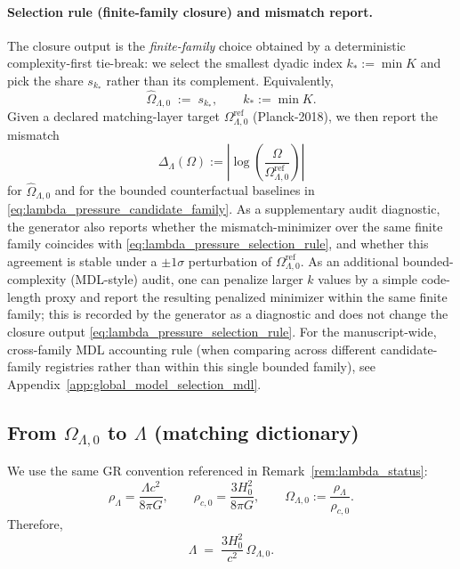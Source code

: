 \paragraph{Selection rule (finite-family closure) and mismatch report.}
\AuditTag The closure output is the \emph{finite-family} choice obtained by a deterministic complexity-first tie-break:
we select the smallest dyadic index $k_\ast:=\min K$ and pick the share $s_{k_\ast}$ rather than its complement.
Equivalently,
\begin{equation}
\label{eq:lambda_pressure_selection_rule}
\widehat\Omega_{\Lambda,0}
\;:=\;
s_{k_\ast},
\qquad
k_\ast:=\min K.
\end{equation}
\MatchTag Given a declared matching-layer target $\Omega_{\Lambda,0}^{\mathrm{ref}}$ (Planck-2018), we then report the mismatch
\[
\Delta_\Lambda(\Omega):=\left|\log\!\left(\frac{\Omega}{\Omega_{\Lambda,0}^{\mathrm{ref}}}\right)\right|
\]
for $\widehat\Omega_{\Lambda,0}$ and for the bounded counterfactual baselines in \eqref{eq:lambda_pressure_candidate_family}.
As a supplementary audit diagnostic, the generator also reports whether the mismatch-minimizer over the same finite family coincides with \eqref{eq:lambda_pressure_selection_rule}, and whether this agreement is stable under a $\pm1\sigma$ perturbation of $\Omega_{\Lambda,0}^{\mathrm{ref}}$.
\AuditTag As an additional bounded-complexity (MDL-style) audit, one can penalize larger $k$ values by a simple code-length proxy and report the resulting penalized minimizer within the same finite family; this is recorded by the generator as a diagnostic and does not change the closure output \eqref{eq:lambda_pressure_selection_rule}.
\AuditTag For the manuscript-wide, cross-family MDL accounting rule (when comparing across different candidate-family registries rather than within this single bounded family), see Appendix~\ref{app:global_model_selection_mdl}.

\subsection{From \texorpdfstring{$\Omega_{\Lambda,0}$}{OmegaLambda0} to \texorpdfstring{$\Lambda$}{Lambda} (matching dictionary)}
\label{subsec:lambda_pressure_to_lambda_dictionary}

\MatchTag We use the same GR convention referenced in Remark~\ref{rem:lambda_status}:
\[
\rho_\Lambda=\frac{\Lambda c^2}{8\pi G},
\qquad
\rho_{c,0}=\frac{3H_0^2}{8\pi G},
\qquad
\Omega_{\Lambda,0}:=\frac{\rho_\Lambda}{\rho_{c,0}}.
\]
Therefore,
\begin{equation}
\label{eq:lambda_from_omega_lambda_h0}
\Lambda
\;=\;
\frac{3H_0^2}{c^2}\,\Omega_{\Lambda,0}.
\end{equation}

